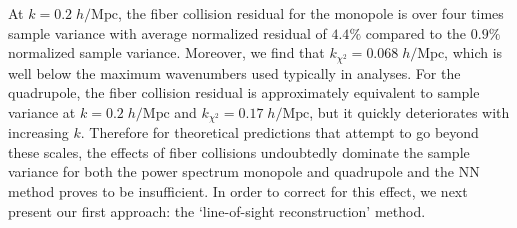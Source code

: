 At $k = 0.2\;h/\mathrm{Mpc}$, the fiber collision residual for 
the monopole is over four times sample variance with average normalized 
residual of $4.4\%$ compared to the $0.9\%$ normalized sample variance. 
Moreover, we find that $k_{\chi^2} = 0.068\;h/\mathrm{Mpc}$, which is well below the maximum wavenumbers used typically in analyses. 
For the quadrupole, the fiber collision residual is approximately equivalent to 
sample variance at $k = 0.2\;h/\mathrm{Mpc}$ and $k_{\chi^2} = 0.17\;h/\mathrm{Mpc}$, but it quickly deteriorates with increasing $k$. 
Therefore for theoretical predictions that attempt to go beyond these scales, the effects of 
fiber collisions undoubtedly dominate the sample variance for both the power 
spectrum monopole and quadrupole and the NN method proves to be insufficient. In order to 
correct for this effect,  we next present our first approach: the `line-of-sight 
reconstruction' method.

